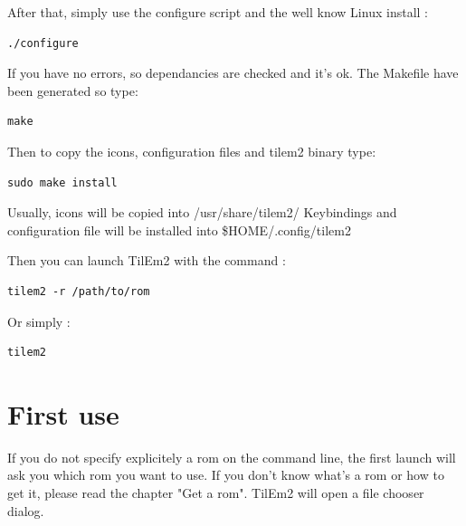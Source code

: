 \documentclass[10pt]{report}
\begin{document}
After that, simply use the configure script and the well know Linux install :\newline
\begin{lstlisting}
./configure
\end{lstlisting}
If you have no errors, so dependancies are checked and it's ok.\newline
The Makefile have been generated so type:\newline
\begin{lstlisting}
make
\end{lstlisting}
Then to copy the icons, configuration files and tilem2 binary type:\newline
\begin{lstlisting}
sudo make install
\end{lstlisting}

Usually, icons will be copied into /usr/share/tilem2/\newline
Keybindings and configuration file will be installed into \$HOME/.config/tilem2\newline

Then you can launch TilEm2 with the command :\newline
\begin{lstlisting}
tilem2 -r /path/to/rom
\end{lstlisting}

Or simply :\newline
\begin{lstlisting}
tilem2
\end{lstlisting}

\section{First use}
If you do not specify explicitely a rom on the command line, the first launch will ask you which rom you want to use.\newline
If you don't know what's a rom or how to get it, please read the chapter "Get a rom".\newline
TilEm2 will open a file chooser dialog.\newline
\end{document}
